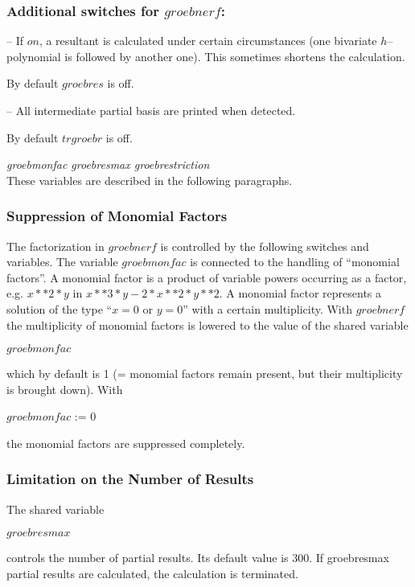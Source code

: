 \subsubsection*{Additional switches for $groebnerf$:}
\begin{description}
\item[$groebres$] -- If $on$, a resultant is calculated under certain
circumstances (one bivariate $h$--polynomial is followed by another
one). This sometimes shortens the calculation.

By default $groebres$ is off.

\item[$trgroebr$] -- All intermediate partial basis are printed when
detected.

By default $trgroebr$ is off.
\end{description}
{\it groebmonfac  groebresmax  groebrestriction} \\
\hspace*{.5cm} These variables are described in the following
paragraphs.

\subsubsection{Suppression of Monomial Factors}
The factorization in $groebnerf$ is controlled by the following
switches and variables.  The variable $groebmonfac$ is connected to
the handling of ``monomial factors''.  A monomial factor is a product
of variable powers occurring as a factor, e.g. $ x**2*y$  in  $x**3*y -
2*x**2*y**2$.  A monomial factor represents a solution of the type
``$ x = 0$  or  $y = 0$'' with a certain multiplicity.  With
$groeb$\-$nerf$ 
the multiplicity of monomial factors is lowered to the value of the
shared variable
\begin{center}
$groebmonfac$
\end{center}
which by default is 1 (= monomial factors remain present, but their
multiplicity is brought down). With
\begin{center}
$groebmonfac$ := 0
\end{center}
the monomial factors are suppressed completely.

\subsubsection{Limitation on the Number of Results}
The shared variable
\begin{center}
$groebresmax$
\end{center}
controls the number of partial results. Its default value is 300. If
groebresmax partial results are calculated, the calculation is
terminated.


